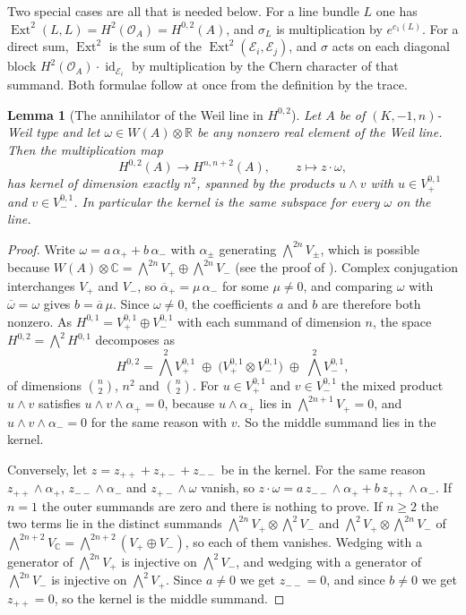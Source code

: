 \documentclass[11pt,reqno]{amsart}
\theoremstyle{plain}
\newtheorem{lemma}[theorem]{Lemma}
\theoremstyle{definition}
\theoremstyle{remark}
\newcommand{\RR}{\mathbb{R}}
\newcommand{\CC}{\mathbb{C}}
\newcommand{\cE}{\mathcal{E}}
\newcommand{\cO}{\mathcal{O}}
\newcommand{\HW}{W}                      %
\DeclareMathOperator{\Ext}{Ext}
\DeclareMathOperator{\id}{id}
\newcommand{\bbar}[1]{\overline{#1}}
\begin{document}
Two special cases are all that is needed below. For a line bundle $L$ one has
$\Ext^{2}(L,L)=H^{2}(\cO_{A})=H^{0,2}(A)$, and $\sigma_{L}$ is multiplication
by $e^{c_{1}(L)}$. For a direct sum, $\Ext^{2}$ is the sum of the
$\Ext^{2}(\cE_{i},\cE_{j})$, and $\sigma$ acts on each diagonal block
$H^{2}(\cO_{A})\cdot\id_{\cE_{i}}$ by multiplication by the Chern character of
that summand. Both formulae follow at once from the definition by the trace.

\begin{lemma}[The annihilator of the Weil line in $H^{0,2}$]
\label{lem:annihilator}
Let $A$ be of $(K,-1,n)$-Weil type and let $\omega\in\HW(A)\otimes\RR$ be
any nonzero real element of the Weil line. Then the multiplication map
\[
  H^{0,2}(A)\longrightarrow H^{n,n+2}(A),\qquad z\longmapsto z\cdot\omega,
\]
has kernel of dimension exactly $n^{2}$, spanned by the products $u\wedge v$
with $u\in V_{+}^{0,1}$ and $v\in V_{-}^{0,1}$. In particular the kernel is
the same subspace for every $\omega$ on the line.
\end{lemma}

\begin{proof}
Write $\omega=a\,\alpha_{+}+b\,\alpha_{-}$ with $\alpha_{\pm}$ generating
$\bigwedge^{2n}V_{\pm}$, which is possible because
$\HW(A)\otimes\CC=\bigwedge^{2n}V_{+}\oplus\bigwedge^{2n}V_{-}$ (see the proof
of ). Complex conjugation interchanges $V_{+}$ and
$V_{-}$, so $\bbar{\alpha}_{+}=\mu\,\alpha_{-}$ for some $\mu\ne0$, and
comparing $\omega$ with $\bbar{\omega}=\omega$ gives $b=\bbar{a}\,\mu$. Since
$\omega\ne0$, the coefficients $a$ and $b$ are therefore both nonzero. As
$H^{0,1}=V_{+}^{0,1}\oplus V_{-}^{0,1}$ with each summand of dimension $n$,
the space $H^{0,2}=\bigwedge^{2}H^{0,1}$ decomposes as
\[
  H^{0,2}
  =\textstyle\bigwedge^{2}V_{+}^{0,1}
  \;\oplus\;\bigl(V_{+}^{0,1}\otimes V_{-}^{0,1}\bigr)
  \;\oplus\;\bigwedge^{2}V_{-}^{0,1},
\]
of dimensions $\binom{n}{2}$, $n^{2}$ and $\binom{n}{2}$.
For $u\in V_{+}^{0,1}$ and $v\in V_{-}^{0,1}$ the mixed product $u\wedge v$
satisfies $u\wedge v\wedge\alpha_{+}=0$, because $u\wedge\alpha_{+}$ lies in
$\bigwedge^{2n+1}V_{+}=0$, and $u\wedge v\wedge\alpha_{-}=0$ for the same
reason with $v$. So the middle summand lies in the kernel.

Conversely, let $z=z_{++}+z_{+-}+z_{--}$ be in the kernel. For the same
reason $z_{++}\wedge\alpha_{+}$, $z_{--}\wedge\alpha_{-}$ and
$z_{+-}\wedge\omega$ vanish, so
$z\cdot\omega=a\,z_{--}\wedge\alpha_{+}+b\,z_{++}\wedge\alpha_{-}$. If $n=1$
the outer summands are zero and there is nothing to prove. If $n\ge2$ the two
terms lie in the distinct summands
$\bigwedge^{2n}V_{+}\otimes\bigwedge^{2}V_{-}$ and
$\bigwedge^{2}V_{+}\otimes\bigwedge^{2n}V_{-}$ of
$\bigwedge^{2n+2}V_{\CC}=\bigwedge^{2n+2}(V_{+}\oplus V_{-})$, so each of them
vanishes. Wedging with a generator of $\bigwedge^{2n}V_{+}$ is injective on
$\bigwedge^{2}V_{-}$, and wedging with a generator of $\bigwedge^{2n}V_{-}$ is
injective on $\bigwedge^{2}V_{+}$. Since $a\neq0$ we get $z_{--}=0$, and since
$b\neq0$ we get $z_{++}=0$, so the kernel is the middle summand.
\end{proof}
\end{document}
